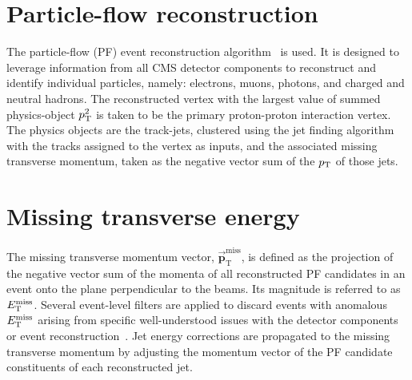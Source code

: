 \section{Particle-flow reconstruction}
\label{sec:pf}
The particle-flow (PF) event reconstruction algorithm~\cite{CMS-PRF-14-001} is used.
It is designed to leverage information from all CMS detector components to reconstruct
and identify individual particles, namely: electrons, muons, photons, and charged and neutral hadrons.
The reconstructed vertex with the largest value of summed physics-object $p_{\mathrm{T}}^2$ is taken to be the primary proton-proton interaction vertex.
The physics objects are the track-jets, clustered using the jet finding algorithm~\cite{Cacciari:2008gp,Cacciari:2011ma} with the 
tracks assigned to the vertex as inputs, and the associated missing transverse momentum, taken as the negative vector sum of the $p_{\mathrm{T}}$ of those jets.

\section{Missing transverse energy}
The missing transverse momentum vector, $\vec{\mathbf{p}}_\mathrm{T}^\mathrm{miss}$, is defined as the projection
of the negative vector sum of the momenta of all reconstructed PF candidates in an event
onto the plane perpendicular to the beams.
Its magnitude is referred to as $E_\mathrm{T}^{\mathrm{miss}}$.  Several event-level filters are applied
to discard events with anomalous $E_\mathrm{T}^{\mathrm{miss}}$ arising from specific well-understood issues 
with the detector components or event reconstruction~\cite{CMS-PAS-JME-16-004}.
Jet energy corrections are propagated to the missing transverse momentum by
adjusting the momentum vector of the PF candidate constituents of each reconstructed jet.

